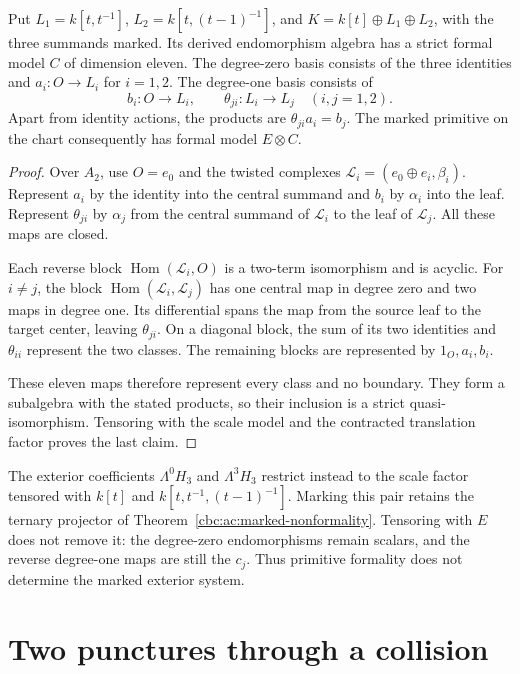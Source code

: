 \begin{proposition}\label{cbc:ac:primitive-formal}
Put $L_1=k[t,t^{-1}]$, $L_2=k[t,(t-1)^{-1}]$,
and $K=k[t]\oplus L_1\oplus L_2$, with the three
summands marked. Its derived endomorphism algebra
has a strict formal model $C$ of dimension eleven.
The degree-zero basis consists of the three identities
and $a_i:O\to L_i$ for $i=1,2$. The degree-one
basis consists of
\[
 b_i:O\to L_i,\qquad
 \theta_{ji}:L_i\to L_j\quad(i,j=1,2).
\]
Apart from identity actions, the products are
$\theta_{ji}a_i=b_j$. The marked primitive on
the chart consequently has formal model $E\otimes C$.
\end{proposition}
\begin{proof}
Over $A_2$, use $O=e_0$ and the twisted complexes
$\mathcal L_i=(e_0\oplus e_i,\beta_i)$.
Represent $a_i$ by the identity into the central
summand and $b_i$ by $\alpha_i$ into the leaf.
Represent $\theta_{ji}$ by $\alpha_j$ from the central
summand of $\mathcal L_i$ to the leaf of
$\mathcal L_j$. All these maps are closed.

Each reverse block $\operatorname{Hom}(\mathcal L_i,O)$
is a two-term isomorphism and is acyclic. For $i\ne j$,
the block $\operatorname{Hom}(\mathcal L_i,\mathcal L_j)$
has one central map in degree zero and two maps in
degree one. Its differential spans the map from the
source leaf to the target center, leaving $\theta_{ji}$.
On a diagonal block, the sum of its two identities
and $\theta_{ii}$ represent the two classes.
The remaining blocks are represented by $1_O,a_i,b_i$.

These eleven maps therefore represent every class and
no boundary. They form a subalgebra with the stated
products, so their inclusion is a strict
quasi-isomorphism. Tensoring with the scale model and
the contracted translation factor proves the last claim.
\end{proof}

The exterior coefficients $\Lambda^0H_3$ and
$\Lambda^3H_3$ restrict instead to the scale factor
tensored with $k[t]$ and
$k[t,t^{-1},(t-1)^{-1}]$. Marking this pair retains
the ternary projector of
Theorem~\ref{cbc:ac:marked-nonformality}.
Tensoring with $E$ does not remove it: the degree-zero
endomorphisms remain scalars, and the reverse
degree-one maps are still the $c_j$.
Thus primitive formality does not determine the
marked exterior system.

\section{Two punctures through a collision}
\label{cbc:ac:confluence}

